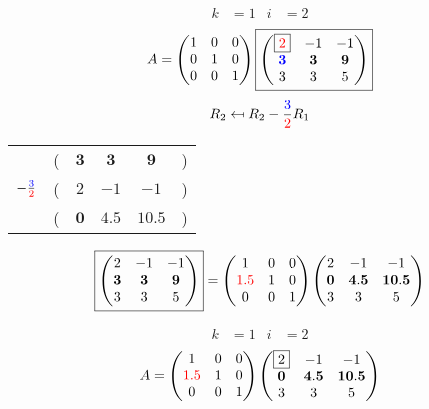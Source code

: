 \documentclass[pdf]{beamer}
\begin{document}
\begin{frame}{}\begin{align*} k &= 1 & i &= 2 \end{align*} $$A=\begin{pmatrix}1&0&0\\0&1&0\\0&0&1\end{pmatrix} \boxed{\begin{pmatrix}\boxed{{\color{red}2}}&-1&-1\\\mathbf{{\color{blue}3}}&\mathbf{3}&\mathbf{9}\\3&3&5\end{pmatrix}} $$ $$R_2 \mapsfrom R_2 - \frac{{\color{blue}3}}{{\color{red}2}} R_1$$ \begin{center}\begin{tabular}{cccccc}  &(& $ \mathbf{3} $ & $ \mathbf{3} $ & $ \mathbf{9} $ &)\\$ -\frac{{\color{blue}3}}{{\color{red}2}} $&(& $ 2 $ & $ -1 $ & $ -1 $ &)\\\hline  &(& $ \mathbf{0} $ & $ \mathbf{4.5} $ & $ \mathbf{10.5} $ &) \end{tabular}\end{center} $$ \boxed{\begin{pmatrix}2&-1&-1\\\mathbf{3}&\mathbf{3}&\mathbf{9}\\3&3&5\end{pmatrix}} = \begin{pmatrix}1&0&0\\{\color{red}1.5}&1&0\\0&0&1\end{pmatrix} \begin{pmatrix}2&-1&-1\\\mathbf{0}&\mathbf{4.5}&\mathbf{10.5}\\3&3&5\end{pmatrix} $$\end{frame}
\begin{frame}{}\begin{align*} k &= 1 & i &= 2 \end{align*}$$A=\begin{pmatrix}1&0&0\\{\color{red}1.5}&1&0\\0&0&1\end{pmatrix} \begin{pmatrix}\boxed{2}&-1&-1\\\mathbf{0}&\mathbf{4.5}&\mathbf{10.5}\\3&3&5\end{pmatrix} $$\end{frame}
\end{document}
